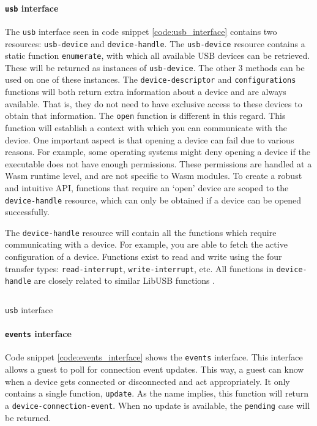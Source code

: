 \paragraph{\texttt{usb} interface}
The \texttt{usb} interface seen in code snippet \ref{code:usb_interface} contains two resources: \texttt{usb-device} and \texttt{device-handle}. The \texttt{usb-device} resource contains a static function \texttt{enumerate}, with which all available USB devices can be retrieved. These will be returned as instances of \texttt{usb-device}. The other 3 methods can be used on one of these instances. The \texttt{device-descriptor} and \texttt{configurations} functions will both return extra information about a device and are always available. That is, they do not need to have exclusive access to these devices to obtain that information. The \texttt{open} function is different in this regard. This function will establish a context with which you can communicate with the device. One important aspect is that opening a device can fail due to various reasons. For example, some operating systems might deny opening a device if the executable does not have enough permissions. These permissions are handled at a \acrshort{Wasm} runtime level, and are not specific to \acrshort{Wasm} modules. To create a robust and intuitive API, functions that require an `open' device are scoped to the \texttt{device-handle} resource, which can only be obtained if a device can be opened successfully.

The \texttt{device-handle} resource will contain all the functions which require communicating with a device. For example, you are able to fetch the active configuration of a device. Functions exist to read and write using the four transfer types: \texttt{read-interrupt}, \texttt{write-interrupt}, etc. All functions in \texttt{device-handle} are closely related to similar LibUSB functions \cite{libusb_docs}. 

\begin{code}
\inputminted[breaklines]{text}{WIT/wit/device.wit}
\caption{\texttt{usb} interface}
\label{code:usb_interface}
\end{code}

\paragraph{\texttt{events} interface}

Code snippet \ref{code:events_interface} shows the \texttt{events} interface. This interface allows a guest to poll for connection event updates. This way, a guest can know when a device gets connected or disconnected and act appropriately. It only contains a single function, \texttt{update}. As the name implies, this function will return a \texttt{device-connection-event}. When no update is available, the \texttt{pending} case will be returned.

